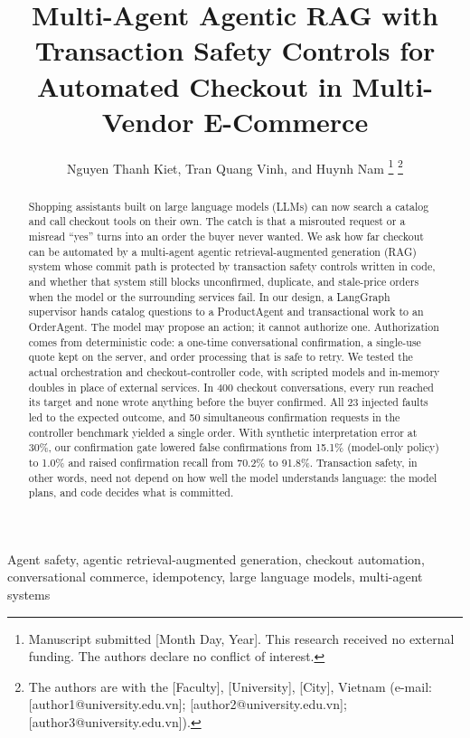 \documentclass{IEEEtran}
\begin{document}
\title{Multi-Agent Agentic RAG with Transaction Safety Controls for Automated Checkout in Multi-Vendor E-Commerce}

\author{ Nguyen Thanh Kiet, Tran Quang Vinh, and Huynh Nam
\thanks{Manuscript submitted [Month Day, Year]. This research received no external funding. The authors declare no conflict of interest.}
\thanks{The authors are with the [Faculty], [University], [City], Vietnam (e-mail: [author1@university.edu.vn]; [author2@university.edu.vn]; [author3@university.edu.vn]).}}

\maketitle

\begin{abstract}
Shopping assistants built on large language models (LLMs) can now search a catalog and call checkout tools on their own. The catch is that a misrouted request or a misread ``yes'' turns into an order the buyer never wanted. We ask how far checkout can be automated by a multi-agent agentic retrieval-augmented generation (RAG) system whose commit path is protected by transaction safety controls written in code, and whether that system still blocks unconfirmed, duplicate, and stale-price orders when the model or the surrounding services fail. In our design, a LangGraph supervisor hands catalog questions to a ProductAgent and transactional work to an OrderAgent. The model may propose an action; it cannot authorize one. Authorization comes from deterministic code: a one-time conversational confirmation, a single-use quote kept on the server, and order processing that is safe to retry. We tested the actual orchestration and checkout-controller code, with scripted models and in-memory doubles in place of external services. In 400 checkout conversations, every run reached its target and none wrote anything before the buyer confirmed. All 23 injected faults led to the expected outcome, and 50 simultaneous confirmation requests in the controller benchmark yielded a single order. With synthetic interpretation error at 30\%, our confirmation gate lowered false confirmations from 15.1\% (model-only policy) to 1.0\% and raised confirmation recall from 70.2\% to 91.8\%. Transaction safety, in other words, need not depend on how well the model understands language: the model plans, and code decides what is committed.
\end{abstract}

\begin{IEEEkeywords}
Agent safety, agentic retrieval-augmented generation, checkout automation, conversational commerce, idempotency, large language models, multi-agent systems
\end{IEEEkeywords}
\end{document}
